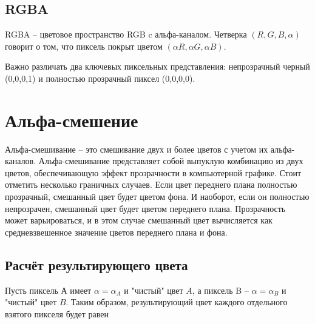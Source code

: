 \subsection{RGBA}
RGBA -- цветовое пространство RGB c альфа-каналом. Четверка $(R, G, B, \alpha)$ говорит о том, что пиксель покрыт цветом $(\alpha R, \alpha G, \alpha B)$. 

\begin{figure}[ht!]
\end{figure}

Важно различать два ключевых пиксельных представления:
непрозрачный черный  (0,0,0,1) и полностью прозрачный пиксел  (0,0,0,0).


\section{Альфа-смешение}
Альфа-смешивание -- это смешивание двух и более цветов с учетом их альфа-каналов. Альфа-смешивание представляет собой выпуклую комбинацию из двух цветов, обеспечивающую эффект прозрачности в компьютерной графике. Стоит отметить несколько граничных случаев. Если цвет переднего плана полностью прозрачный, смешанный цвет будет цветом фона. И наоборот, если он полностью непрозрачен, смешанный цвет будет цветом переднего плана.
Прозрачность может варьироваться, и в этом случае смешанный цвет вычисляется как средневзвешенное значение цветов переднего плана и фона.

\subsection{Расчёт результирующего цвета}
Пусть пиксель А имеет $\alpha = \alpha_{A}$ и "чистый" цвет $A$, а пиксель B  -- $\alpha = \alpha_{B}$ и "чистый" цвет $B$. Таким образом,  результирующий цвет каждого отдельного взятого пикселя будет равен

